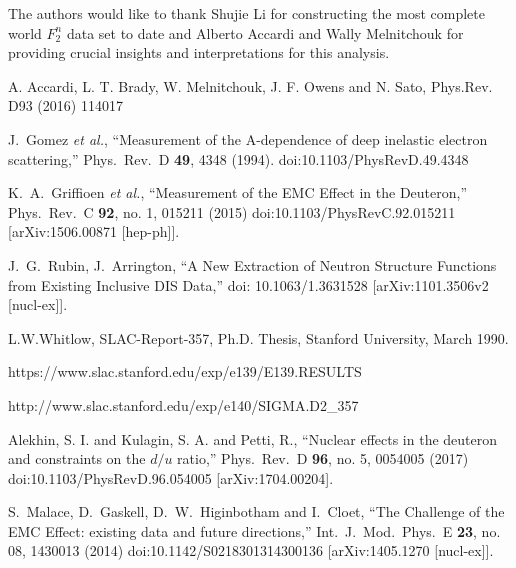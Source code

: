 \documentclass[oneside]{article}
\begin{document}
The authors would like to thank Shujie Li for constructing the most complete world $F_2^n$ data set to date and Alberto Accardi and Wally Melnitchouk for providing crucial insights and interpretations for this analysis.  


\begin{thebibliography}{99} 

 A. Accardi, L. T. Brady, W. Melnitchouk, J. F. Owens and N. Sato, Phys.Rev. D93 (2016) 114017

  J.~Gomez {\it et al.},
  ``Measurement of the A-dependence of deep inelastic electron scattering,''
  Phys.\ Rev.\ D {\bf 49}, 4348 (1994).
  doi:10.1103/PhysRevD.49.4348

  K.~A.~Griffioen {\it et al.},
  ``Measurement of the EMC Effect in the Deuteron,''
  Phys.\ Rev.\ C {\bf 92}, no. 1, 015211 (2015)
  doi:10.1103/PhysRevC.92.015211
  [arXiv:1506.00871 [hep-ph]].

  J.~G.~Rubin, J.~Arrington,
  ``A New Extraction of Neutron Structure Functions from Existing Inclusive DIS Data,''
  doi:	10.1063/1.3631528
  [arXiv:1101.3506v2 [nucl-ex]].
  
 L.W.Whitlow, SLAC-Report-357, Ph.D. Thesis, Stanford University, March 1990.

 https://www.slac.stanford.edu/exp/e139/E139.RESULTS

 http://www.slac.stanford.edu/exp/e140/SIGMA.D2\_357

 Alekhin, S. I. and Kulagin, S. A. and Petti, R.,
  ``Nuclear effects in the deuteron and constraints on the $d/u$ ratio,''
  Phys.\ Rev.\ D {\bf 96}, no. 5, 0054005 (2017)
  doi:10.1103/PhysRevD.96.054005
  [arXiv:1704.00204].

  S.~Malace, D.~Gaskell, D.~W.~Higinbotham and I.~Cloet,
  ``The Challenge of the EMC Effect: existing data and future directions,''
  Int.\ J.\ Mod.\ Phys.\ E {\bf 23}, no. 08, 1430013 (2014)
  doi:10.1142/S0218301314300136
  [arXiv:1405.1270 [nucl-ex]].
 
 
\end{thebibliography}

\end{document}
